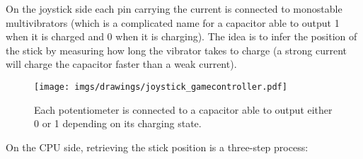 \par
On the joystick side each pin carrying the current is connected to monostable multivibrators (which is a complicated name for a capacitor able to output 1 when it is charged and 0 when it is charging). The idea is to infer the position of the stick by measuring how long the vibrator takes to charge (a strong current will charge the capacitor faster than a weak current).\\
\par
\par
\begin{figure}[H]
\centering
\texttt{[image: imgs/drawings/joystick\_gamecontroller.pdf]}
\caption{Each potentiometer is connected to a capacitor able to output either 0 or 1 depending on its charging state.}
\end{figure}
\par
On the CPU side, retrieving the stick position is a three-step process:

